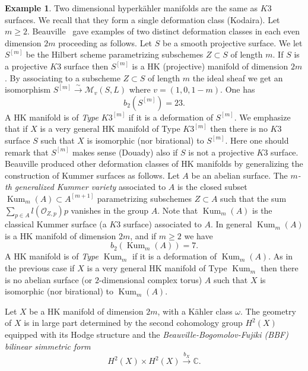 \documentclass[11pt]{amsart}
\newcommand{\CC}{{\mathbb C}}
\let\mathcal\mathscr
\def\cM{\mathcal{M}}
\def\cO{\mathcal{O}}
\DeclareMathOperator{\Kum}{Kum}
\theoremstyle{definition}
\newtheorem{expl}[lmm]{Example}
\theoremstyle{remark}
\begin{document}
\begin{expl}\label{expl:esempihk}
%
Two dimensional hyperk\"ahler  manifolds are the same as $K3$ surfaces. We recall that they form a single deformation class (Kodaira). 
Let $m\ge 2$. Beauville~\cite{beauv:ciunozero} gave examples of two distinct deformation classes in each even dimension  $2m$ proceeding as follows. Let $S$ be a smooth projective  surface. We let $S^{[m]}$ be the Hilbert scheme parametrizing subschemes $Z\subset S$ of length $m$.  If $S$ is a projective $K3$ surface then 
$S^{[m]}$ is a HK (projective) manifold  of dimension $2m$. By associating  to a subscheme $Z\subset S$ of length $m$ the ideal sheaf we get an isomorphism $S^{[m]}\xrightarrow{\sim}\cM_v(S,L)$ where $v=(1,0,1-m)$. One has
\begin{equation}
%
b_2(S^{[m]})=23.
%
\end{equation}
%
A HK manifold  is of \emph{Type $K3^{[m]}$} if it is a deformation of $S^{[m]}$. We emphasize that if $X$ is a very general HK manifold  of Type  $K3^{[m]}$ then there is no $K3$ surface $S$ such that $X$ is  isomorphic  (nor birational) to $S^{[m]}$. Here one should remark that $S^{[m]}$ makes sense (Douady) also if $S$ is not a projective $K3$ surface.  
Beauville produced other deformation classes of HK manifolds by generalizing the construction of Kummer surfaces as follows. 
Let $A$ be an abelian surface. The \emph{$m$-th generalized Kummer variety}  associated to $A$ is  the closed subset  $\Kum_m(A)\subset A^{[m+1]}$ parametrizing subschemes $Z\subset A$ such that the sum $\sum_{p\in A}l(\cO_{Z,p})p$ vanishes in the group $A$. Note that $\Kum_m(A)$ is the classical Kummer surface (a $K3$ surface) associated to $A$. In general $\Kum_m(A)$ is a HK manifold of dimension $2m$, and if $m\ge 2$ we have
\begin{equation}
%
b_2(\Kum_m(A))=7.
%
\end{equation}
%
A HK manifold  is of \emph{Type $\Kum_m$} if it is a deformation of $\Kum_m(A)$.  
As in the previous case  if $X$ is a very general HK manifold  of Type $\Kum_m$ then there is no abelian surface (or $2$-dimensional complex torus) $A$ such that $X$ is  isomorphic  (nor birational) to $\Kum_m(A)$. 
%
\end{expl}
%
Let $X$ be a HK manifold of dimension $2m$, with a K\"ahler class $\omega$. The geometry of $X$ is in large part determined by the second cohomology group $H^2(X)$ equipped with its Hodge structure and the \emph{Beauville-Bogomolov-Fujiki (BBF) bilinear simmetric form} 
%
\begin{equation}\label{eccobbf}
%
H^2(X)\times H^2(X) \xrightarrow{b_X} \CC.
%
\end{equation}
\end{document}
